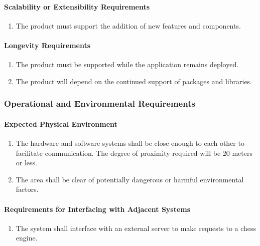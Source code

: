 \documentclass[12pt]{article}
\begin{document}
\paragraph{Scalability or Extensibility Requirements}
\begin{enumerate}[{PR}1., leftmargin=2\parindent, resume]
    \item The product must support the addition of new features and components.
\end{enumerate}

\paragraph{Longevity Requirements}
\begin{enumerate}[{PR}1., leftmargin=2\parindent, resume]
    \item The product must be supported while the application remains deployed.
    \item The product will depend on the continued support of packages and libraries.
\end{enumerate}



\subsubsection{Operational and Environmental Requirements}
\label{NFR_OE}
\paragraph{Expected Physical Environment}
\begin{enumerate}[{OE}1., leftmargin=2\parindent]
    \item The hardware and software systems shall be close enough to each other to facilitate communication. The degree of proximity required 
    will be 20 meters or less.
    \item The area shall be clear of potentially dangerous or harmful environmental factors.
\end{enumerate}

\paragraph{Requirements for Interfacing with Adjacent Systems}
\begin{enumerate}[{OE}1., leftmargin=2\parindent, resume]
    \item The system shall interface with an external server to make requests to a chess engine.
\end{enumerate}
\end{document}
